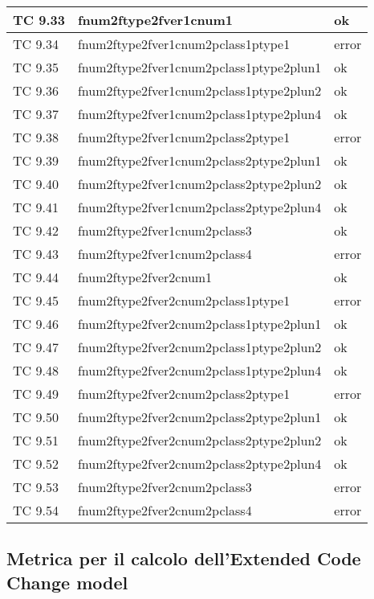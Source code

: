 \begin{longtable}{|p{3cm}|p{7cm}|p{3cm}|}
	\hline
	TC 9.33			& fnum2ftype2fver1cnum1				& ok \tabularnewline
	\hline
	TC 9.34			& fnum2ftype2fver1cnum2pclass1ptype1		& error \tabularnewline
	\hline
	TC 9.35			& fnum2ftype2fver1cnum2pclass1ptype2plun1	& ok \tabularnewline
	\hline
	TC 9.36			& fnum2ftype2fver1cnum2pclass1ptype2plun2	& ok \tabularnewline
	\hline
	TC 9.37			& fnum2ftype2fver1cnum2pclass1ptype2plun4	& ok \tabularnewline
	\hline
	TC 9.38			& fnum2ftype2fver1cnum2pclass2ptype1		& error \tabularnewline
	\hline
	TC 9.39			& fnum2ftype2fver1cnum2pclass2ptype2plun1	& ok \tabularnewline
	\hline
	TC 9.40			& fnum2ftype2fver1cnum2pclass2ptype2plun2	& ok \tabularnewline
	\hline
	TC 9.41			& fnum2ftype2fver1cnum2pclass2ptype2plun4	& ok \tabularnewline
	\hline
	TC 9.42			& fnum2ftype2fver1cnum2pclass3			& ok \tabularnewline
	\hline
	TC 9.43			& fnum2ftype2fver1cnum2pclass4			& error \tabularnewline
	\hline
	TC 9.44			& fnum2ftype2fver2cnum1				& ok \tabularnewline
	\hline
	TC 9.45			& fnum2ftype2fver2cnum2pclass1ptype1		& error \tabularnewline
	\hline
	TC 9.46			& fnum2ftype2fver2cnum2pclass1ptype2plun1	& ok \tabularnewline
	\hline
	TC 9.47			& fnum2ftype2fver2cnum2pclass1ptype2plun2	& ok \tabularnewline
	\hline
	TC 9.48			& fnum2ftype2fver2cnum2pclass1ptype2plun4	& ok \tabularnewline
	\hline
	TC 9.49			& fnum2ftype2fver2cnum2pclass2ptype1		& error \tabularnewline
	\hline
	TC 9.50			& fnum2ftype2fver2cnum2pclass2ptype2plun1	& ok \tabularnewline
	\hline
	TC 9.51			& fnum2ftype2fver2cnum2pclass2ptype2plun2	& ok \tabularnewline
	\hline
	TC 9.52			& fnum2ftype2fver2cnum2pclass2ptype2plun4	& ok \tabularnewline
	\hline
	TC 9.53			& fnum2ftype2fver2cnum2pclass3			& error \tabularnewline
	\hline
	TC 9.54			& fnum2ftype2fver2cnum2pclass4			& error \tabularnewline
	\hline
\end{longtable}
\clearpage



\subsection{Metrica per il calcolo dell'Extended Code Change model}

